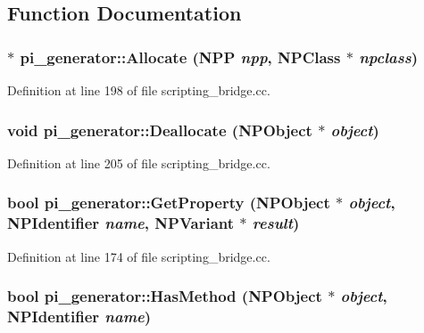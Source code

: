 \subsection{Function Documentation}
\hypertarget{namespacepi__generator_a94f67bed2d50304566aa1f7c35f91ab2}{
\subsubsection[{Allocate}]{ $\ast$ pi\_\-generator::Allocate ({\bf NPP} {\em npp}, \/  {\bf NPClass} $\ast$ {\em npclass})}}
\label{namespacepi__generator_a94f67bed2d50304566aa1f7c35f91ab2}


Definition at line 198 of file scripting\_\-bridge.cc.

\hypertarget{namespacepi__generator_a36cb8ad170a393eedf2f477fa7561f62}{
\subsubsection[{Deallocate}]{\setlength{\rightskip}{0pt plus 5cm}void pi\_\-generator::Deallocate ({\bf NPObject} $\ast$ {\em object})}}
\label{namespacepi__generator_a36cb8ad170a393eedf2f477fa7561f62}


Definition at line 205 of file scripting\_\-bridge.cc.

\hypertarget{namespacepi__generator_aa945b983b43a437de8e06ebbbe8f6064}{
\subsubsection[{GetProperty}]{\setlength{\rightskip}{0pt plus 5cm}bool pi\_\-generator::GetProperty ({\bf NPObject} $\ast$ {\em object}, \/  {\bf NPIdentifier} {\em name}, \/  {\bf NPVariant} $\ast$ {\em result})}}
\label{namespacepi__generator_aa945b983b43a437de8e06ebbbe8f6064}


Definition at line 174 of file scripting\_\-bridge.cc.

\hypertarget{namespacepi__generator_a952c6436fb4cc8d87e830f81f3bae284}{
\subsubsection[{HasMethod}]{\setlength{\rightskip}{0pt plus 5cm}bool pi\_\-generator::HasMethod ({\bf NPObject} $\ast$ {\em object}, \/  {\bf NPIdentifier} {\em name})}}
\label{namespacepi__generator_a952c6436fb4cc8d87e830f81f3bae284}


